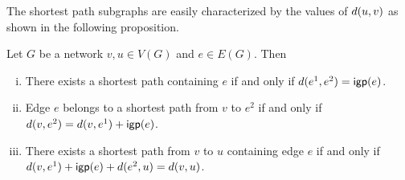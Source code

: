 The shortest path subgraphs are easily characterized by the values of $d(u, v)$ as shown in the following proposition.

\begin{proposition}
\label{prop:sp-properties}
Let $G$ be a network $v, u \in V(G)$ and $e \in E(G)$. Then
\begin{enumerate}[i)]
 \item There exists a shortest path containing $e$ if and only if $d(e^1, e^2) = \mathsf{igp}(e)$.
 \item Edge $e$ belongs to a shortest path from $v$ to $e^2$ if and only if 
 $d(v, e^2) = d(v, e^1) + \mathsf{igp}(e)$. 
 \item There exists a shortest path from $v$ to $u$ containing edge $e$ if and only if
 $d(v, e^1) + \mathsf{igp}(e) + d(e^2, u) = d(v, u)$.
\end{enumerate}
\end{proposition}


